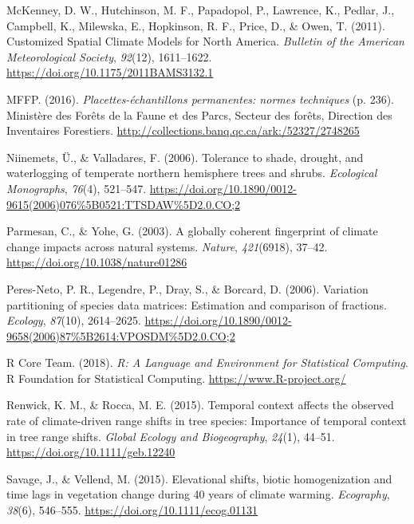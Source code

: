 \documentclass[
  a4paperpaper,
]{article}
\begin{document}
\leavevmode\hypertarget{ref-mckenney_customized_2011}{}%
McKenney, D. W., Hutchinson, M. F., Papadopol, P., Lawrence, K., Pedlar,
J., Campbell, K., Milewska, E., Hopkinson, R. F., Price, D., \& Owen, T.
(2011). Customized Spatial Climate Models for North America.
\emph{Bulletin of the American Meteorological Society}, \emph{92}(12),
1611--1622. \url{https://doi.org/10.1175/2011BAMS3132.1}

\leavevmode\hypertarget{ref-mffp_placettes-echantillons_2016}{}%
MFFP. (2016). \emph{Placettes-échantillons permanentes: normes
techniques} (p. 236). Ministère des Forêts de la Faune et des Parcs,
Secteur des forêts, Direction des Inventaires Forestiers.
\url{http://collections.banq.qc.ca/ark:/52327/2748265}

\leavevmode\hypertarget{ref-niinemets_tolerance_2006}{}%
Niinemets, Ü., \& Valladares, F. (2006). Tolerance to shade, drought,
and waterlogging of temperate northern hemisphere trees and shrubs.
\emph{Ecological Monographs}, \emph{76}(4), 521--547.
\url{https://doi.org/10.1890/0012-9615(2006)076\%5B0521:TTSDAW\%5D2.0.CO;2}

\leavevmode\hypertarget{ref-parmesan_globally_2003}{}%
Parmesan, C., \& Yohe, G. (2003). A globally coherent fingerprint of
climate change impacts across natural systems. \emph{Nature},
\emph{421}(6918), 37--42. \url{https://doi.org/10.1038/nature01286}

\leavevmode\hypertarget{ref-peres-neto_variation_2006}{}%
Peres-Neto, P. R., Legendre, P., Dray, S., \& Borcard, D. (2006).
Variation partitioning of species data matrices: Estimation and
comparison of fractions. \emph{Ecology}, \emph{87}(10), 2614--2625.
\url{https://doi.org/10.1890/0012-9658(2006)87\%5B2614:VPOSDM\%5D2.0.CO;2}

\leavevmode\hypertarget{ref-r_core_team_r_2018}{}%
R Core Team. (2018). \emph{R: A Language and Environment for Statistical
Computing}. R Foundation for Statistical Computing.
\url{https://www.R-project.org/}

\leavevmode\hypertarget{ref-renwick_temporal_2015}{}%
Renwick, K. M., \& Rocca, M. E. (2015). Temporal context affects the
observed rate of climate-driven range shifts in tree species: Importance
of temporal context in tree range shifts. \emph{Global Ecology and
Biogeography}, \emph{24}(1), 44--51.
\url{https://doi.org/10.1111/geb.12240}

\leavevmode\hypertarget{ref-savage_elevational_2015}{}%
Savage, J., \& Vellend, M. (2015). Elevational shifts, biotic
homogenization and time lags in vegetation change during 40 years of
climate warming. \emph{Ecography}, \emph{38}(6), 546--555.
\url{https://doi.org/10.1111/ecog.01131}
\end{document}
